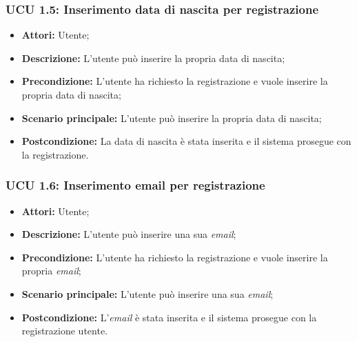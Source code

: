 \hypertarget{U1.5}{}
\subsubsection{UCU 1.5: Inserimento data di nascita per registrazione}
\begin{itemize}
	\item \textbf{Attori:} Utente;
	\item \textbf{Descrizione:} L'utente può inserire la propria data di nascita;
	\item \textbf{Precondizione:} L'utente ha richiesto la registrazione e vuole inserire la propria data di nascita;
	\item \textbf{Scenario principale:} L'utente può inserire la propria data di nascita;
	\item \textbf{Postcondizione:} La data di nascita è stata inserita e il sistema prosegue con la registrazione.
\end{itemize}

\hypertarget{U1.6}{}
\subsubsection{UCU 1.6: Inserimento email per registrazione}
\begin{itemize}
	\item \textbf{Attori:} Utente;
	\item \textbf{Descrizione:} L'utente può inserire una sua \textit{email};
	\item \textbf{Precondizione:} L'utente ha richiesto la registrazione e vuole inserire la propria \textit{email};
	\item \textbf{Scenario principale:} L'utente può inserire una sua \textit{email};
\item \textbf{Postcondizione:} L'\textit{email} è stata inserita e il sistema prosegue con la registrazione utente.
\end{itemize}

\hypertarget{U2}{}
